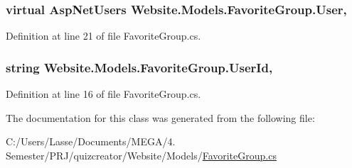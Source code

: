 \subsubsection[{User}]{\setlength{\rightskip}{0pt plus 5cm}virtual {\bf Asp\+Net\+Users} Website.\+Models.\+Favorite\+Group.\+User\hspace{0.3cm}{\ttfamily [get]}, {\ttfamily [set]}}\label{class_website_1_1_models_1_1_favorite_group_a024158ace51660f77eec7d6a40b67c7a}


Definition at line 21 of file Favorite\+Group.\+cs.

\hypertarget{class_website_1_1_models_1_1_favorite_group_a26a0058e6a90024ce53d2414ca80ba8e}{}
\subsubsection[{User\+Id}]{\setlength{\rightskip}{0pt plus 5cm}string Website.\+Models.\+Favorite\+Group.\+User\+Id\hspace{0.3cm}{\ttfamily [get]}, {\ttfamily [set]}}\label{class_website_1_1_models_1_1_favorite_group_a26a0058e6a90024ce53d2414ca80ba8e}


Definition at line 16 of file Favorite\+Group.\+cs.



The documentation for this class was generated from the following file\+:\begin{DoxyCompactItemize}
\item 
C\+:/\+Users/\+Lasse/\+Documents/\+M\+E\+G\+A/4. Semester/\+P\+R\+J/quizcreator/\+Website/\+Models/\hyperlink{_favorite_group_8cs}{Favorite\+Group.\+cs}\end{DoxyCompactItemize}
